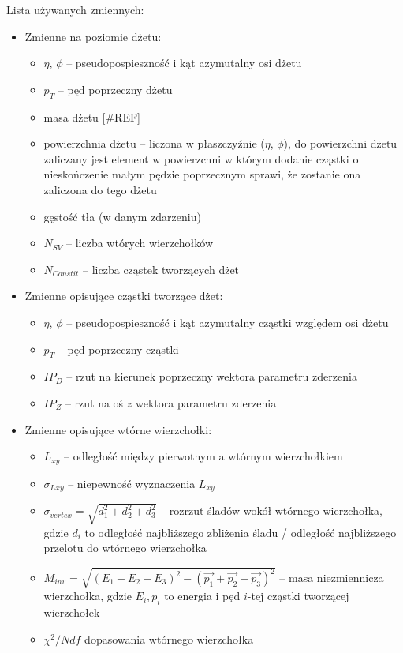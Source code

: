 Lista używanych zmiennych:
\begin{itemize}
	\item Zmienne na poziomie dżetu:
	\begin{itemize}	
		\item $\eta$, $\phi$ -- pseudopospieszność i kąt azymutalny osi dżetu
		\item $p_T$ -- pęd poprzeczny dżetu
		\item masa dżetu [\#REF]
		\item powierzchnia dżetu -- liczona w płaszczyźnie ($\eta$, $\phi$),   do powierzchni dżetu zaliczany jest element w powierzchni w którym dodanie cząstki o nieskończenie małym pędzie poprzecznym sprawi, że zostanie ona zaliczona do tego dżetu \cite{Cacciari:2007fd}
		\item gęstość tła (w danym zdarzeniu)
		\item $N_{SV}$ -- liczba wtórych wierzchołków
		\item $N_{Constit}$ -- liczba cząstek tworzących dżet
	\end{itemize}
	
	
	\item Zmienne opisujące cząstki tworzące dżet:
	\begin{itemize}	
		\item $\eta$, $\phi$ -- pseudopospieszność i kąt azymutalny cząstki względem osi dżetu
		\item $p_T$ -- pęd poprzeczny cząstki
		\item $IP_D$ -- rzut na kierunek poprzeczny wektora parametru zderzenia
		\item $IP_Z$ -- rzut na oś $z$ wektora parametru zderzenia
	\end{itemize}	
	
	
	\item Zmienne opisujące wtórne wierzchołki:
	\begin{itemize}	
		\item $L_{xy}$ -- odległość między pierwotnym a wtórnym wierzchołkiem 
		\item $\sigma_{Lxy}$ -- niepewność wyznaczenia $L_{xy}$
		\item $\sigma_{vertex} = \sqrt{d_1^2 + d_2^2 + d_3^2}$ -- rozrzut śladów  wokół wtórnego wierzchołka, gdzie $d_i$ to odległość najbliższego zbliżenia śladu / odległość najbliższego przelotu do wtórnego wierzchołka  %
		\item $M_{inv} = \sqrt{(E_1 + E_2 + E_3)^2 - (\vec{p_1} + \vec{p_2} + \vec{p_3})^2}$ -- masa niezmiennicza wierzchołka, gdzie $E_i, p_i$ to energia i pęd $i$-tej cząstki tworzącej wierzchołek
		\item $\chi^2/Ndf$  dopasowania wtórnego wierzchołka
	\end{itemize}
\end{itemize}


